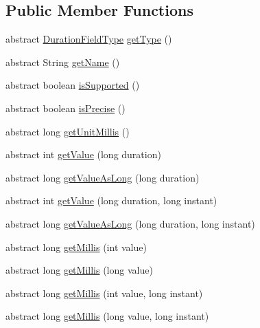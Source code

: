 \subsection*{Public Member Functions}
\begin{DoxyCompactItemize}
\item 
abstract \hyperlink{classorg_1_1joda_1_1time_1_1_duration_field_type}{Duration\-Field\-Type} \hyperlink{classorg_1_1joda_1_1time_1_1_duration_field_a10f96bd696c8cce2eb7020359ecec74f}{get\-Type} ()
\item 
abstract String \hyperlink{classorg_1_1joda_1_1time_1_1_duration_field_a24e9b08ff10e58df81aa6d12e2e76128}{get\-Name} ()
\item 
abstract boolean \hyperlink{classorg_1_1joda_1_1time_1_1_duration_field_a763809f34d5c827a715f7f81ac485ad0}{is\-Supported} ()
\item 
abstract boolean \hyperlink{classorg_1_1joda_1_1time_1_1_duration_field_aa068ba156fd9dc06ce2d6121690795fc}{is\-Precise} ()
\item 
abstract long \hyperlink{classorg_1_1joda_1_1time_1_1_duration_field_ab77adc9488456690be1a2d333e009610}{get\-Unit\-Millis} ()
\item 
abstract int \hyperlink{classorg_1_1joda_1_1time_1_1_duration_field_aed983d82e98413d7e61e9f2f0830f2e4}{get\-Value} (long duration)
\item 
abstract long \hyperlink{classorg_1_1joda_1_1time_1_1_duration_field_a2a0c7a02df94f09f0aeb623aca1976ce}{get\-Value\-As\-Long} (long duration)
\item 
abstract int \hyperlink{classorg_1_1joda_1_1time_1_1_duration_field_a9586a654c5c554325f5f52b16bbc61fc}{get\-Value} (long duration, long instant)
\item 
abstract long \hyperlink{classorg_1_1joda_1_1time_1_1_duration_field_ac6f19b7c41593f5909396ac5da8f1de8}{get\-Value\-As\-Long} (long duration, long instant)
\item 
abstract long \hyperlink{classorg_1_1joda_1_1time_1_1_duration_field_a5542c5363d362033215f5000ba0cf4b8}{get\-Millis} (int value)
\item 
abstract long \hyperlink{classorg_1_1joda_1_1time_1_1_duration_field_a240c14dec7323c8232c033b5870dd5c0}{get\-Millis} (long value)
\item 
abstract long \hyperlink{classorg_1_1joda_1_1time_1_1_duration_field_a480213438661b136f553ea390edbf8b3}{get\-Millis} (int value, long instant)
\item 
abstract long \hyperlink{classorg_1_1joda_1_1time_1_1_duration_field_ac6d505e0bb70feea591ca88bd083f7e1}{get\-Millis} (long value, long instant)

\end{DoxyCompactItemize}
